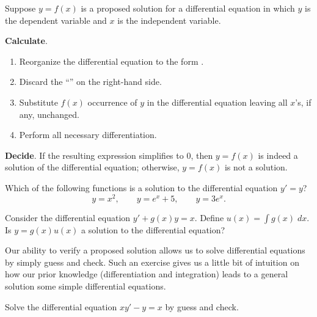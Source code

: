 \documentclass[../main.tex]{subfiles}
\begin{document}
\begin{mdframed}[style=simple-compact]
  Suppose \(y = f(x)\) is a proposed solution for a differential equation in which \(y\) is the dependent variable and \(x\) is the independent variable. 

  \textbf{Calculate}.
  \begin{enumerate}
    \item Reorganize the differential equation to the form .
    \item Discard the ``'' on the right-hand side. 
    \item Substitute \(f(x)\)  occurrence of \(y\) in the differential equation leaving all \(x\)'s, if any, unchanged.
    \item Perform all necessary differentiation. 
  \end{enumerate} 

  \textbf{Decide}. If the resulting expression simplifies to \(0\), then \(y = f(x)\) is indeed a solution of the differential equation; otherwise, \(y = f(x)\) is not a solution.
\end{mdframed}
\clearpage

\begin{example}
  Which of the following functions is a solution to the differential equation \(y' = y\)?
  \[
    y = x^{2}, \qquad y = e^{x} + 5, \qquad y = 3e^{x}.
  \]

\end{example}

\begin{example}
  Consider the differential equation \(y' + g(x) y = x\). Define \(u(x) = \int g(x) \;dx\). Is \(y = g(x)u(x)\) a solution to the differential equation?

\end{example}
\clearpage

Our ability to verify a proposed solution allows us to solve differential equations by simply guess and check. Such an exercise gives us a little bit of intuition on how our prior knowledge (differentiation and integration) leads to a general solution some simple differential equations.
\begin{example}
  Solve the differential equation \(xy' - y = x\) by guess and check.
\end{example}
\end{document}
